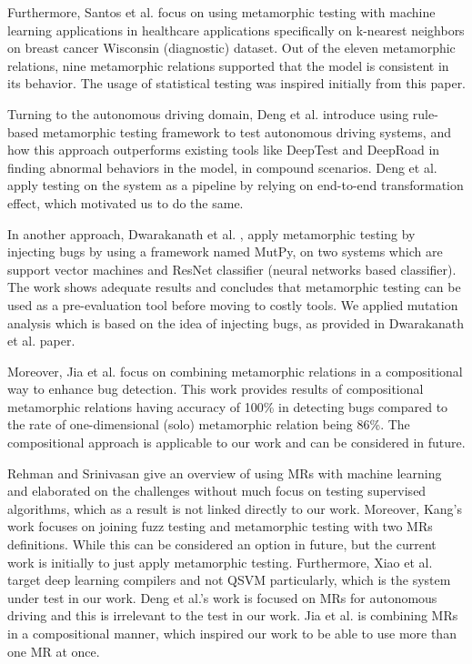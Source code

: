 \documentclass[12pt,a4paper]{article}
\begin{document}
	Furthermore, Santos et al. \cite{ssantos2020} focus on using metamorphic testing with machine learning applications in healthcare applications specifically on k-nearest neighbors on breast cancer Wisconsin (diagnostic) dataset. Out of the eleven metamorphic relations, nine metamorphic relations supported that the model is consistent in its behavior. The usage of statistical testing was inspired initially from this paper.
	
	Turning to the autonomous driving domain, Deng et al. \cite{ydeng2023} introduce using rule-based metamorphic testing framework to test autonomous driving systems, and how this approach outperforms existing tools like DeepTest and DeepRoad in finding abnormal behaviors in the model, in compound scenarios.	 Deng et al. \cite{ydeng2023} apply testing on the system as a pipeline by relying on end-to-end transformation effect, which motivated us to do the same.
	
	In another approach, Dwarakanath et al. \cite{Dwarakanath2018}, apply metamorphic testing by injecting bugs by using a framework named MutPy, on two systems which are support vector machines and ResNet classifier (neural networks based classifier). The work shows adequate results and concludes that metamorphic testing can be used as a pre-evaluation tool before moving to costly tools. We applied mutation analysis which is based on the idea of injecting bugs, as provided in Dwarakanath et al. \cite{Dwarakanath2018} paper.
	
	Moreover, Jia et al. \cite{mjia2020} focus on combining metamorphic relations in a compositional way to enhance bug detection. This work provides results of compositional metamorphic relations having accuracy of 100\% in detecting bugs compared to the rate of one-dimensional (solo) metamorphic relation being 86\%. The compositional approach is applicable to our work and can be considered in future.
	
	Rehman and Srinivasan \cite{frehman2023} give an overview of using MRs with machine learning and elaborated on the challenges without much focus on testing supervised algorithms, which as a result is not linked directly to our work. Moreover, Kang's work \cite{dkang2022} focuses on joining fuzz testing and metamorphic testing with two MRs definitions. While this can be considered an option in future, but the current work is initially to just apply metamorphic testing. Furthermore, Xiao et al. \cite{dciao2022} target deep learning compilers and not QSVM particularly, which is the system under test in our work. Deng et al.'s \cite{ydeng2023} work is focused on MRs for autonomous driving and this is irrelevant to the test in our work. Jia et al. \cite{mjia2020} is combining MRs in a compositional manner, which inspired our work to be able to use more than one MR at once.
	
\end{document}
